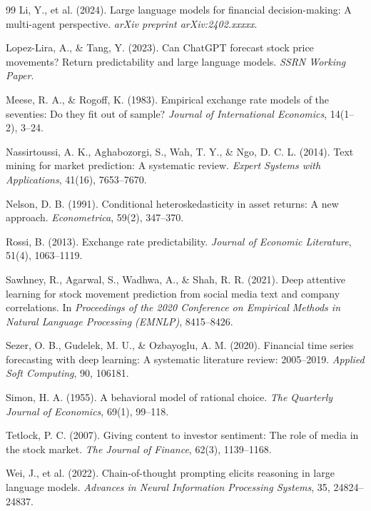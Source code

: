 \documentclass[11pt]{article}
\begin{document}
\begin{thebibliography}{99}
Li, Y., et al. (2024).
Large language models for financial decision-making: A multi-agent perspective.
\textit{arXiv preprint arXiv:2402.xxxxx}.

Lopez-Lira, A., \& Tang, Y. (2023).
Can ChatGPT forecast stock price movements? Return predictability and large language models.
\textit{SSRN Working Paper}.

Meese, R. A., \& Rogoff, K. (1983).
Empirical exchange rate models of the seventies: Do they fit out of sample?
\textit{Journal of International Economics}, 14(1--2), 3--24.

Nassirtoussi, A. K., Aghabozorgi, S., Wah, T. Y., \& Ngo, D. C. L. (2014).
Text mining for market prediction: A systematic review.
\textit{Expert Systems with Applications}, 41(16), 7653--7670.

Nelson, D. B. (1991).
Conditional heteroskedasticity in asset returns: A new approach.
\textit{Econometrica}, 59(2), 347--370.

Rossi, B. (2013).
Exchange rate predictability.
\textit{Journal of Economic Literature}, 51(4), 1063--1119.

Sawhney, R., Agarwal, S., Wadhwa, A., \& Shah, R. R. (2021).
Deep attentive learning for stock movement prediction from social media text and company correlations.
In \textit{Proceedings of the 2020 Conference on Empirical Methods in Natural Language Processing (EMNLP)}, 8415--8426.

Sezer, O. B., Gudelek, M. U., \& Ozbayoglu, A. M. (2020).
Financial time series forecasting with deep learning: A systematic literature review: 2005--2019.
\textit{Applied Soft Computing}, 90, 106181.

Simon, H. A. (1955).
A behavioral model of rational choice.
\textit{The Quarterly Journal of Economics}, 69(1), 99--118.

Tetlock, P. C. (2007).
Giving content to investor sentiment: The role of media in the stock market.
\textit{The Journal of Finance}, 62(3), 1139--1168.

Wei, J., et al. (2022).
Chain-of-thought prompting elicits reasoning in large language models.
\textit{Advances in Neural Information Processing Systems}, 35, 24824--24837.


\end{thebibliography}
\end{document}
